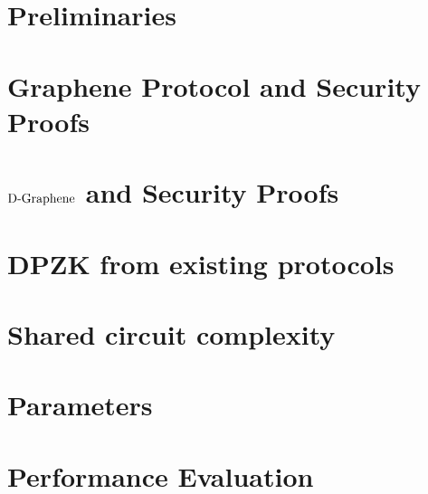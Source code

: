 \documentclass[USenglish,oneside,twocolumn]{article}
\begin{document}
\section{Preliminaries}
\label{app:securitydef}

\section{Graphene Protocol and Security Proofs}
\label{app:grapehene_securityproofs}

\section{$\text{D-Graphene}$ and Security Proofs}
\label{app:dp_grapehene_securityproofs}

\section{DPZK from existing protocols}
\label{app:dpzk_others}

\section*{ }
\label{app:DP_Protocols}

\section{Shared circuit complexity}
\label{app:shared_ciruit}

\section{Parameters}
\label{app:Parameters}

\section{Performance Evaluation}
\label{sec:performancecompare}


\end{document}
